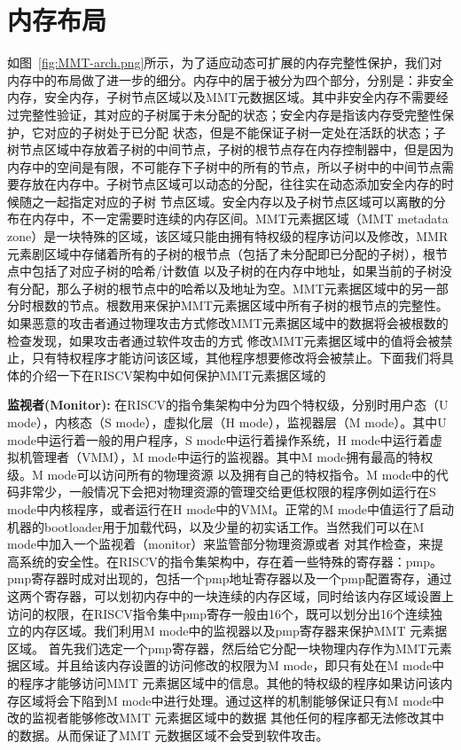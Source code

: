\section{内存布局}
如图~\ref{fig:MMT-arch.png}所示，为了适应动态可扩展的内存完整性保护，我们对内存中的布局做了进一步的细分。内存中的居于被分为四个部分，分别是：非安全内存，安全内存，子树节点区域以及MMT元数据区域。其中非安全内存不需要经过完整性验证，其对应的子树属于未分配的状态；安全内存是指该内存受完整性保护，它对应的子树处于已分配
状态，但是不能保证子树一定处在活跃的状态；子树节点区域中存放着子树的中间节点，子树的根节点存在内存控制器中，但是因为内存中的空间是有限，不可能存下子树中的所有的节点，所以子树中的中间节点需要存放在内存中。子树节点区域可以动态的分配，往往实在动态添加安全内存的时候随之一起指定对应的子树
节点区域。安全内存以及子树节点区域可以离散的分布在内存中，不一定需要时连续的内存区间。MMT元素据区域（MMT metadata zone）是一块特殊的区域，该区域只能由拥有特权级的程序访问以及修改，MMR元素剧区域中存储着所有的子树的根节点（包括了未分配即已分配的子树），根节点中包括了对应子树的哈希/计数值
以及子树的在内存中地址，如果当前的子树没有分配，那么子树的根节点中的哈希以及地址为空。MMT元素据区域中的另一部分时根数的节点。根数用来保护MMT元素据区域中所有子树的根节点的完整性。如果恶意的攻击者通过物理攻击方式修改MMT元素据区域中的数据将会被根数的检查发现，如果攻击者通过软件攻击的方式
修改MMT元素据区域中的值将会被禁止，只有特权程序才能访问该区域，其他程序想要修改将会被禁止。下面我们将具体的介绍一下在RISCV架构中如何保护MMT元素据区域的

\textbf{监视者(Monitor): }在RISCV的指令集架构中分为四个特权级，分别时用户态（U mode），内核态（S mode），虚拟化层（H mode），监视器层（M mode）。其中U mode中运行着一般的用户程序，S mode中运行着操作系统，H mode中运行着虚拟机管理者（VMM），M mode中运行的监视器。其中M mode拥有最高的特权级。M mode可以访问所有的物理资源
以及拥有自己的特权指令。M mode中的代码非常少，一般情况下会把对物理资源的管理交给更低权限的程序例如运行在S mode中内核程序，或者运行在H mode中的VMM。正常的M mode中值运行了启动机器的bootloader用于加载代码，以及少量的初实话工作。当然我们可以在M mode中加入一个监视着（monitor）来监管部分物理资源或者
对其作检查，来提高系统的安全性。在RISCV的指令集架构中，存在着一些特殊的寄存器：pmp。pmp寄存器时成对出现的，包括一个pmp地址寄存器以及一个pmp配置寄存，通过这两个寄存器，可以划初内存中的一块连续的内存区域，同时给该内存区域设置上访问的权限，在RISCV指令集中pmp寄存一般由16个，既可以划分出16个连续独立的内存区域。我们利用M mode中的监视器以及pmp寄存器来保护MMT 元素据区域。
首先我们选定一个pmp寄存器，然后给它分配一块物理内存作为MMT元素据区域。并且给该内存设置的访问修改的权限为M mode，即只有处在M mode中的程序才能够访问MMT 元素据区域中的信息。其他的特权级的程序如果访问该内存区域将会下陷到M mode中进行处理。通过这样的机制能够保证只有M mode中改的监视者能够修改MMT 元素据区域中的数据
其他任何的程序都无法修改其中的数据。从而保证了MMT 元数据区域不会受到软件攻击。

